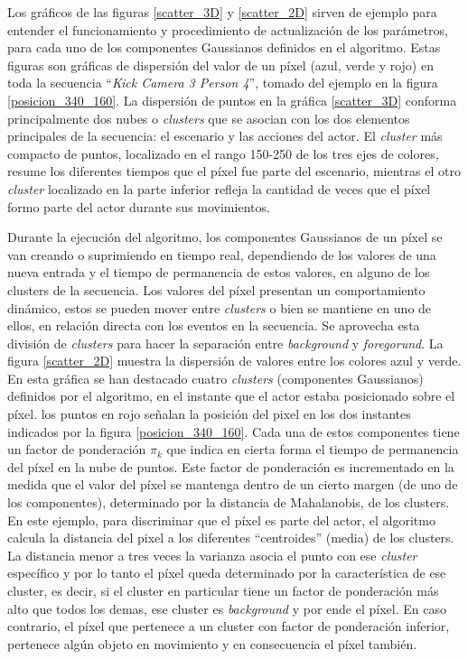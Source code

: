 Los gráficos de las figuras \ref{scatter_3D} y \ref{scatter_2D} sirven de ejemplo para entender el funcionamiento y procedimiento de actualización de los parámetros, para cada uno de los componentes Gaussianos definidos en el algoritmo. Estas figuras son gráficas de dispersión del valor de un píxel (azul, verde y rojo) en toda la secuencia ``\textit{Kick Camera 3 Person 4}'', tomado del ejemplo en la figura \ref{posicion_340_160}. La dispersión de puntos en la gráfica \ref{scatter_3D} conforma principalmente dos nubes o \textit{clusters} que se asocian con los dos elementos principales de la secuencia: el escenario y las acciones del actor. El \textit{cluster} más compacto de puntos, localizado en el rango 150-250 de los tres ejes de colores, resume los diferentes tiempos que el píxel fue parte del escenario, mientras el otro \textit{cluster} localizado en la parte inferior refleja la cantidad de veces que el píxel formo parte del actor durante sus movimientos.  

Durante la ejecución del algoritmo, los componentes Gaussianos de un píxel se van creando o suprimiendo en tiempo real, dependiendo de los valores de una nueva entrada y el tiempo de permanencia de estos valores, en alguno de los clusters de la secuencia. Los valores del píxel presentan un comportamiento dinámico, estos se pueden mover entre \textit{clusters} o bien se mantiene en uno de ellos, en relación directa con los eventos en la secuencia. Se aprovecha esta división de \textit{clusters} para hacer la separación entre \textit{background} y \textit{foregorund}. La figura \ref{scatter_2D} muestra la dispersión de valores entre los colores azul y verde. En esta gráfica se han destacado cuatro \textit{clusters} (componentes Gaussianos) definidos por el algoritmo, en el instante que el actor estaba posicionado sobre el píxel. los puntos en rojo señalan la posición del pixel en los dos instantes indicados por la figura \ref{posicion_340_160}. Cada una de estos componentes tiene un factor de ponderación $\pi_k$ que indica en cierta forma el tiempo de permanencia del píxel en la nube de puntos. Este factor de ponderación es incrementado en la medida que el valor del píxel se mantenga dentro de un cierto margen (de uno de los componentes), determinado por la distancia de Mahalanobis, de los clusters. En este ejemplo, para discriminar que el píxel es parte del actor, el algoritmo calcula la distancia del pixel a los diferentes ``centroides'' (media) de los clusters. La distancia menor a tres veces la varianza asocia el punto con ese \textit{cluster} específico y por lo tanto el píxel queda determinado por la característica de ese cluster, es decir, si el cluster en particular tiene un factor de ponderación más alto que todos los demas, ese cluster es \textit{background} y por ende el píxel. En caso contrario, el píxel que pertenece a un cluster con factor de ponderación inferior, pertenece algún objeto en movimiento y en consecuencia el píxel también.  




